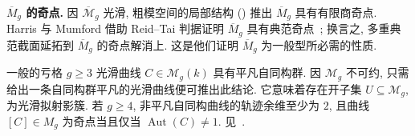 \noindent\textbf{$\overline M_g$ 的奇点.} 因 $\overline{\mathcal M}_g$ 光滑, 粗模空间的局部结构 () 推出 $\overline M_g$ 具有有限商奇点. Harris 与 Mumford 借助 Reid--Tai 判据证明 $\overline M_g$ 具有典范奇点~\cite{HM82}; 换言之, 多重典范截面延拓到 $\overline M_g$ 的奇点解消上. 这是他们证明 $\overline M_g$ 为一般型所必需的性质.

一般的亏格 $g\geq3$ 光滑曲线 $C\in\mathcal M_g(k)$ 具有平凡自同构群. 因 $\mathcal M_g$ 不可约, 只需给出一条自同构群平凡的光滑曲线便可推出此结论. 它意味着存在开子集 $U\subseteq\mathcal M_g$, 为光滑拟射影簇. 若 $g\geq4$, 非平凡自同构曲线的轨迹余维至少为 $2$, 且曲线 $[C]\in M_g$ 为奇点当且仅当 $\operatorname{Aut}(C)\ne1$. 见~\cite{Rau62,Pop69}.

